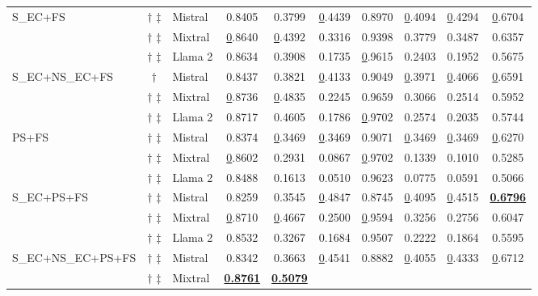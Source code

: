 \begin{table*}[!h]
\begin{tabular}{@{}lclccccccc@{}}
\multirow{3}{*}{S\_EC+FS} &
  $\dagger$ $\ddagger$ &
  Mistral &
  0.8405 &
  0.3799 &
  {\ul 0.4439} &
  0.8970 &
  {\ul 0.4094} &
  {\ul 0.4294} &
  {\ul 0.6704} \\
 &
  $\dagger$ $\ddagger$ &
  Mixtral &
  {\ul 0.8640} &
  {\ul 0.4392} &
  0.3316 &
  0.9398 &
  0.3779 &
  0.3487 &
  0.6357 \\
 &
  $\dagger$ $\ddagger$ &
  Llama 2 &
  0.8634 &
  0.3908 &
  0.1735 &
  {\ul 0.9615} &
  0.2403 &
  0.1952 &
  0.5675 \\ \cmidrule(l){3-10}
\multirow{3}{*}{S\_EC+NS\_EC+FS} &
  $\dagger$ \hspace{0.46em} &
  Mistral &
  0.8437 &
  0.3821 &
  {\ul 0.4133} &
  0.9049 &
  {\ul 0.3971} &
  {\ul 0.4066} &
  {\ul 0.6591} \\
 &
  $\dagger$ $\ddagger$ &
  Mixtral &
  {\ul 0.8736} &
  {\ul 0.4835} &
  0.2245 &
  0.9659 &
  0.3066 &
  0.2514 &
  0.5952 \\
 &
  $\dagger$ $\ddagger$ &
  Llama 2 &
  0.8717 &
  0.4605 &
  0.1786 &
  {\ul 0.9702} &
  0.2574 &
  0.2035 &
  0.5744 \\ \cmidrule(l){3-10}
\multirow{3}{*}{PS+FS} &
  $\dagger$ $\ddagger$ &
  Mistral &
  0.8374 &
  {\ul 0.3469} &
  {\ul 0.3469} &
  0.9071 &
  {\ul 0.3469} &
  {\ul 0.3469} &
  {\ul 0.6270} \\
 &
  $\dagger$ $\ddagger$ &
  Mixtral &
  {\ul 0.8602} &
  0.2931 &
  0.0867 &
  {\ul 0.9702} &
  0.1339 &
  0.1010 &
  0.5285 \\
 &
  $\dagger$ $\ddagger$ &
  Llama 2 &
  0.8488 &
  0.1613 &
  0.0510 &
  0.9623 &
  0.0775 &
  0.0591 &
  0.5066 \\ \cmidrule(l){3-10}
\multirow{3}{*}{S\_EC+PS+FS} &
  $\dagger$ $\ddagger$ &
  Mistral &
  0.8259 &
  0.3545 &
  {\ul 0.4847} &
  0.8745 &
  {\ul 0.4095} &
  {\ul 0.4515} &
  {\ul \textbf{0.6796}} \\
 &
  $\dagger$ $\ddagger$ &
  Mixtral &
  {\ul 0.8710} &
  {\ul 0.4667} &
  0.2500 &
  {\ul 0.9594} &
  0.3256 &
  0.2756 &
  0.6047 \\
 &
  $\dagger$ $\ddagger$ &
  Llama 2 &
  0.8532 &
  0.3267 &
  0.1684 &
  0.9507 &
  0.2222 &
  0.1864 &
  0.5595 \\ \cmidrule(l){3-10}
\multirow{3}{*}{S\_EC+NS\_EC+PS+FS} &
  $\dagger$ $\ddagger$ &
  Mistral &
  0.8342 &
  0.3663 &
  {\ul 0.4541} &
  0.8882 &
  {\ul 0.4055} &
  {\ul 0.4333} &
  {\ul 0.6712} \\
 &
  $\dagger$ $\ddagger$ &
  Mixtral &
  {\ul \textbf{0.8761}} &
  {\ul \textbf{0.5079}} &

\end{tabular}
\end{table*}
